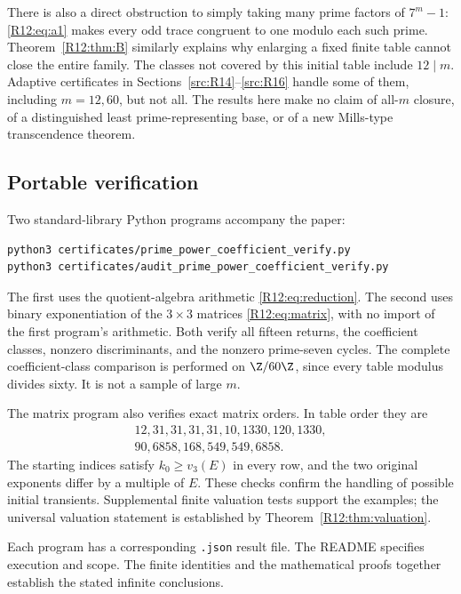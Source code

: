 \documentclass[11pt,a4paper]{article}
\theoremstyle{definition}\newtheorem{definition}[theorem]{Definition}
\theoremstyle{remark}\newtheorem{remark}[theorem]{Remark}
\begin{document}
There is also a direct obstruction to simply taking many prime
factors of $7^m-1$: \eqref{R12:eq:a1} makes every odd trace congruent to
one modulo each such prime. Theorem~\ref{R12:thm:B} similarly explains
why enlarging a fixed finite table cannot close the entire family.
The classes not covered by this initial table include $12\mid m$. Adaptive certificates in Sections~\ref{src:R14}--\ref{src:R16} handle some of them, including $m=12,60$, but not all. The results here make no claim of all-$m$
closure, of a distinguished least prime-representing base, or of
a new Mills-type transcendence theorem.


\subsection{Portable verification}

Two standard-library Python programs accompany the paper:
\begin{verbatim}
python3 certificates/prime_power_coefficient_verify.py
python3 certificates/audit_prime_power_coefficient_verify.py
\end{verbatim}
The first uses the quotient-algebra arithmetic \eqref{R12:eq:reduction}.
The second uses binary exponentiation of the $3\times3$ matrices
\eqref{R12:eq:matrix}, with no import of the first program's arithmetic.
Both verify all fifteen returns, the coefficient classes, nonzero
discriminants, and the nonzero prime-seven cycles. The complete
coefficient-class comparison is performed on $\Z/60\Z$, since every
table modulus divides sixty. It is not a sample of large $m$.

The matrix program also verifies exact matrix orders. In table order
they are
\[
\begin{gathered}
12,31,31,31,31,10,1330,120,1330,\\
90,6858,168,549,549,6858.
\end{gathered}
\]
The starting indices satisfy $k_0\ge v_3(E)$ in every row, and the
two original exponents differ by a multiple of $E$. These checks
confirm the handling of possible initial transients. Supplemental
finite valuation tests support the examples; the universal valuation
statement is established by Theorem~\ref{R12:thm:valuation}.

Each program has a corresponding \texttt{.json} result file. The README
specifies execution and scope. The finite identities and the mathematical
proofs together establish the stated infinite conclusions.

\endgroup
\end{document}
